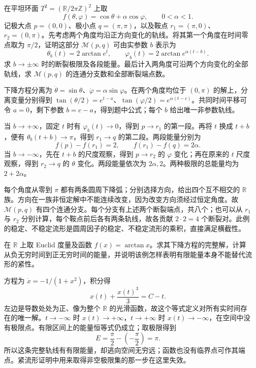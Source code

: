 \begin{exercise}\label{g2:ex:torus-broken-trajectories}
	在平坦环面 \(T^2=(\mathbb R/2\pi\mathbb Z)^2\) 上取
	\[
		f(\theta,\varphi)=\cos\theta+\alpha\cos\varphi,\qquad 0<\alpha<1.
	\]
	记极大点 \(p=(0,0)\)、极小点 \(q=(\pi,\pi)\)，以及鞍点 \(r_1=(\pi,0)\)、\(r_2=(0,\pi)\)。先考虑两个角度均沿正方向变化的轨线。将其第一个角度在时间零点取为 \(\pi/2\)，证明这部分 \(\mathcal M(p,q)\) 可由实参数 \(b\) 表示为
	\[
		\theta_b(t)=2\arctan e^t,\qquad
		\varphi_b(t)=2\arctan e^{\alpha(t-b)}.
	\]
	求 \(b\to\pm\infty\) 时的断裂极限及各段能量。最后计入两角度可沿两个方向变化的全部轨线，求 \(\mathcal M(p,q)\) 的连通分支数和全部断裂端点数。
\end{exercise}
\begin{solution}
	下降方程分离为 \(\dot\theta=\sin\theta\)、\(\dot\varphi=\alpha\sin\varphi\)。在两个角度均位于 \((0,\pi)\) 的解上，分离变量分别得到 \(\tan(\theta/2)=e^{t-a}\)、\(\tan(\varphi/2)=e^{\alpha(t-c)}\)。共同时间平移可令 \(a=0\)，剩下参数 \(b=c-a\)，得到题中公式；每个 \(b\) 给出唯一非参数轨线。

	当 \(b\to+\infty\)，固定 \(t\) 时有 \(\varphi_b(t)\to0\)，得到 \(p\to r_1\) 的第一段。再将 \(t\) 换成 \(t+b\)，便有 \(\theta_b(t+b)\to\pi\)，得到 \(r_1\to q\) 的第二段。两段能量分别为
	\[
		f(p)-f(r_1)=2,\qquad f(r_1)-f(q)=2\alpha.
	\]
	当 \(b\to-\infty\)，先在 \(t+b\) 的尺度观察，得到 \(p\to r_2\) 的 \(\varphi\) 变化；再在原来的 \(t\) 尺度观察，得到 \(r_2\to q\) 的 \(\theta\) 变化。两段能量依次为 \(2\alpha,2\)。两种极限的总能量均为 \(2+2\alpha\)。

	每个角度从零到 \(\pi\) 都有两条圆周下降弧；分别选择方向，给出四个互不相交的 \(\mathbb R\) 族。方向在一族非恒定解中不能连续改变，因为改变方向须经过恒定角度。故 \(\mathcal M(p,q)\) 有四个连通分支。每个分支有上述两个断裂端点，共八个；也可以从 \(r_1\) 与 \(r_2\) 分别计算，每个鞍点前后各有两条轨线，故各贡献 \(2\cdot2=4\) 个断裂对。此例的稳定、不稳定流形是圆周因子的稳定、不稳定流形的乘积，直接满足横截性。
\end{solution}

\begin{exercise}\label{g2:ex:finite-energy-escape}
	在 \(\mathbb R\) 上取 Euclid 度量及函数 \(f(x)=\arctan x\)。求其下降方程的完整解，计算从负无穷时间到正无穷时间的能量，并说明该例怎样表明有限能量本身不能替代流形的紧性。
\end{exercise}
\begin{solution}
	方程为 \(\dot x=-1/(1+x^2)\)，积分得
	\[
		x(t)+\frac{x(t)^3}{3}=C-t.
	\]
	左边是导数处处为正、像为整个 \(\mathbb R\) 的光滑函数，故这个等式定义对所有实时间存在的唯一解。\(t\to-\infty\) 时 \(x(t)\to+\infty\)，\(t\to+\infty\) 时 \(x(t)\to-\infty\)，在空间中没有极限点。有限区间上的能量恒等式仍成立；取极限得到
	\[
		E=\frac{\pi}{2}-\left(-\frac{\pi}{2}\right)=\pi.
	\]
	所以这条完整轨线有有限能量，却逃向空间无穷远；函数也没有临界点可作其端点。紧流形证明中用来取得非空极限集的那一步在这里失效。
\end{solution}

